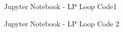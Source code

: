 \documentclass[a4paper]{report}
\begin{document}
\begin{figure}[H]
\centering
{}
\caption{Jupyter Notebook -  LP Loop Code1}
\label{fig:LOOP1}
\end{figure}


\begin{figure}[H]
\centering
{}
\caption{Jupyter Notebook -  LP Loop Code 2}
\label{fig:LOOP2}
\end{figure}
\end{document}
